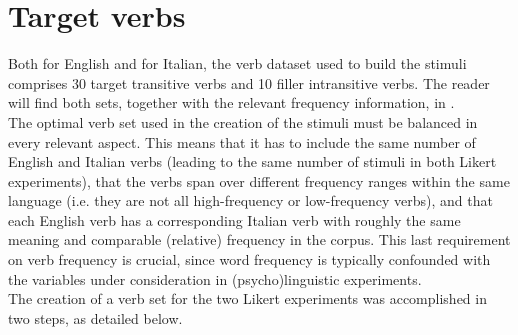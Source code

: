 \section{Target verbs} 
Both for English and for Italian, the verb dataset used to build the stimuli comprises 30 target transitive verbs and 10 filler intransitive verbs. The reader will find both sets, together with the relevant frequency information, in .\\
The optimal verb set used in the creation of the stimuli must be balanced in every relevant aspect. This means that it has to include the same number of English and Italian verbs (leading to the same number of stimuli in both Likert experiments), that the verbs span over different frequency ranges within the same language (i.e. they are not all high-frequency or low-frequency verbs), and that each English verb has a corresponding Italian verb with roughly the same meaning and comparable (relative) frequency in the corpus. This last requirement on verb frequency is crucial, since word frequency is typically confounded with the variables under consideration in (psycho)linguistic experiments.\\
The creation of a verb set for the two Likert experiments was accomplished in two steps, as detailed below.


